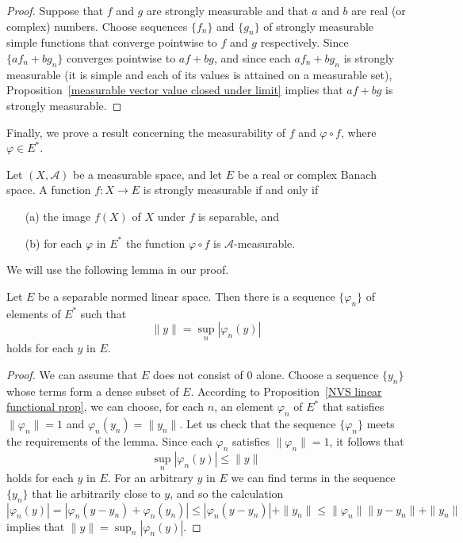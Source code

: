 \begin{proof}
Suppose that $f$ and $g$ are strongly measurable and that $a$ and $b$ are real (or complex) numbers. Choose sequences $\{f_n\}$ and $\{g_n\}$ of strongly measurable simple functions that converge pointwise to $f$ and $g$ respectively. Since $\{af_n+bg_n\}$ converges pointwise to $af+bg$, and since each $af_n+bg_n$ is strongly measurable (it is simple and each of its values is attained on a measurable set), Proposition~\ref{measurable vector value closed under limit} implies that $af+bg$ is strongly measurable.
\end{proof}
Finally, we prove a result concerning the measurability of $f$ and $\varphi\circ f$, where $\varphi\in E^*$.
\begin{theorem}\label{strong measurable iff weak}
Let $(X,\mathcal{A})$ be a measurable space, and let $E$ be a real or complex Banach space. A function $f:X\to E$ is strongly measurable if and only if
\begin{itemize}
\item[(a)] the image $f(X)$ of $X$ under $f$ is separable, and
\item[(b)] for each $\varphi$ in $E^*$ the function $\varphi\circ f$ is $\mathcal{A}$-measurable.
\end{itemize}
\end{theorem}
We will use the following lemma in our proof.
\begin{lemma}\label{strong measurable iff weak lemma}
Let $E$ be a separable normed linear space. Then there is a sequence $\{\varphi_n\}$ of elements of $E^*$ such that
\[\|y\|=\sup_n|\varphi_n(y)|\]
holds for each $y$ in $E$.
\end{lemma}
\begin{proof}
We can assume that $E$ does not consist of $0$ alone. Choose a sequence $\{y_n\}$ whose terms form a dense subset of $E$. According to Proposition~\ref{NVS linear functional prop}, we can choose, for each $n$, an element $\varphi_n$ of $E^*$ that satisfies $\|\varphi_n\|=1$ and $\varphi_n(y_n)=\|y_n\|$. Let us check that the sequence $\{\varphi_n\}$ meets the requirements of the lemma. Since each $\varphi_n$ satisfies $\|\varphi_n\|=1$, it follows that
\[\sup_n|\varphi_n(y)|\leq\|y\|\]
holds for each $y$ in $E$. For an arbitrary $y$ in $E$ we can find terms in the sequence $\{y_n\}$ that lie arbitrarily close to $y$, and so the calculation
\[|\varphi_n(y)|=|\varphi_n(y-y_n)+\varphi_n(y_n)|\leq|\varphi_n(y-y_n)|+\|y_n\|\leq\|\varphi_n\|\|y-y_n\|+\|y_n\|\]
implies that $\|y\|=\sup_n|\varphi_n(y)|$.
\end{proof}
